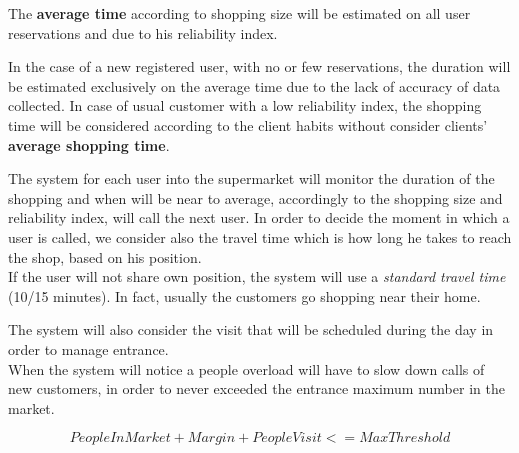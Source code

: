 The \textbf{average time} according to shopping size will be estimated on all user reservations and  due to his reliability index.

 

In the case of a new registered user, with no or few reservations, the duration will be estimated exclusively on the average time due to the lack of accuracy of data collected.
In case of usual customer with a low reliability index, the shopping time will be considered according to the client habits without consider clients' \textbf{average shopping time}.

 

The system for each user into the supermarket will monitor the duration of the shopping and when will be near to average, accordingly to the shopping size and reliability index, will call the next user. In order to decide the moment in which a user is called, we consider also the travel time which is how long he takes to reach the shop, based on his position.\\
If the user will not share own position, the system will use a \textit{standard travel time} (10/15 minutes). In fact, usually the customers go shopping near their home.

 

The system will also consider the visit that will be scheduled during the day in order to manage entrance.\\
When the system will notice a people overload will have to slow down calls of new customers, in order to never exceeded the entrance maximum number in the market. 
  
\[PeopleInMarket + Margin + PeopleVisit <= MaxThreshold\]

